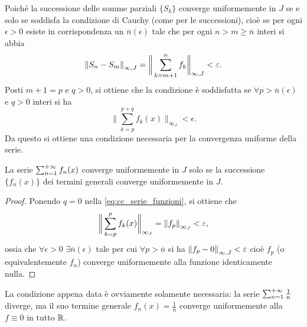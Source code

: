 Poiché la successione delle somme parziali $\{S_k\}$ converge uniformemente in $J$ se e solo se soddisfa la condizione di Cauchy (come per le successioni), cioè se per ogni $\epsilon>0$ esiste in corrispondenza un $\overline{n}(\epsilon)$ tale che per ogni $n>m\geq\overline{n}$ interi si abbia
\[
\left\|{S_n-S_m}\right\|_{\infty,J}=\bigg\|\sum_{k=m+1}^nf_k\bigg\|_{\infty,J}<\varepsilon.
\]
Posti $m+1=p$ e $q>0$, si ottiene che la condizione è soddisfatta se $\forall p>\overline{n}(\epsilon)$ e $q>0$ interi si ha
\begin{equation} \label{eq:cc_serie_funzioni}
\bigg\|\sum_{k=p}^{p+q}f_k(x)\bigg\|_{\infty_J}<\epsilon.
\end{equation}
Da questo si ottiene una condizione necessaria per la convergenza uniforme della serie.
\begin{corollario}
La serie $\sum_{{n}=1}^{+\infty}f_n(x)$ converge uniformemente in $J$ solo se la successione $\{f_n(x)\}$ dei termini generali converge uniformemente in $J$.
\end{corollario}
\begin{proof}
Ponendo $q=0$ nella \eqref{eq:cc_serie_funzioni}, si ottiene che
\[
\bigg\|\sum_{k=p}^{p}f_k(x)\bigg\|_{\infty_J}=\left\|{f_p}\right\|_{\infty_J}<\varepsilon,
\]
ossia che $\forall\epsilon>0$ $\exists\overline{n}(\epsilon)$ tale per cui $\forall p>\overline{n}$ si ha $\left\|{f_p-0}\right\|_{\infty,J}<\varepsilon$ cioè $f_p$ (o equivalentemente $f_n$) converge uniformemente alla funzione identicamente nulla.
\end{proof}
La condizione appena data è ovviamente solamente necessaria: la serie $\sum_{{n}=1}^{+\infty}\frac1{n}$ diverge, ma il suo termine generale $f_n(x)=\frac1{n}$ converge uniformemente alla $f\equiv 0$ in tutto $\mathbb{R}$.

